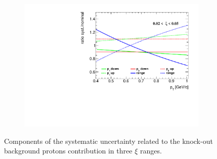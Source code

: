 \begin{figure}[h!]
\begin{subfigure}{.49\textwidth}
 	\end{subfigure}
 	\begin{subfigure}{.49\textwidth}
 		\includegraphics[width=\textwidth,page=3]{chapters/chrgSTAR/img/DCAproton/p_bkg.pdf}
 	\end{subfigure}
 	\begin{minipage}{.49\textwidth}
 		\caption[Components of the systematic uncertainty related to the  knock-out background protons contribution in three $\xi$ ranges]{Components of the systematic uncertainty related to the  knock-out background protons contribution in three $\xi$ ranges. }
 		\label{fig:protonBkgSyst}
 	\end{minipage}
 	
 \end{figure}
 
